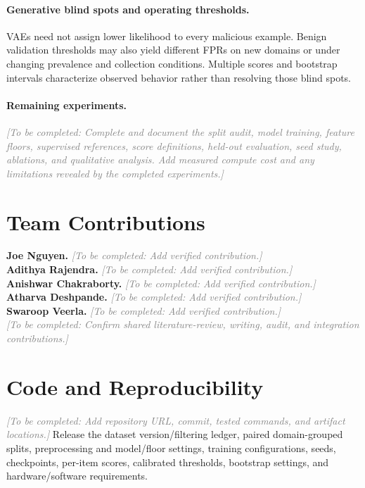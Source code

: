 \documentclass{article}
\newcommand{\pending}[1]{\textcolor{gray}{\textit{[To be completed: #1]}}}
\begin{document}
\paragraph{Generative blind spots and operating thresholds.}
VAEs need not assign lower likelihood to every malicious example.
Benign validation thresholds may also yield different FPRs on new domains or under changing prevalence and collection conditions.
Multiple scores and bootstrap intervals characterize observed behavior rather than resolving those blind spots.

\paragraph{Remaining experiments.}
\pending{Complete and document the split audit, model training, feature floors, supervised references, score definitions, held-out evaluation, seed study, ablations, and qualitative analysis. Add measured compute cost and any limitations revealed by the completed experiments.}

\section*{Team Contributions}

\noindent\textbf{Joe Nguyen.} \pending{Add verified contribution.}\\
\noindent\textbf{Adithya Rajendra.} \pending{Add verified contribution.}\\
\noindent\textbf{Anishwar Chakraborty.} \pending{Add verified contribution.}\\
\noindent\textbf{Atharva Deshpande.} \pending{Add verified contribution.}\\
\noindent\textbf{Swaroop Veerla.} \pending{Add verified contribution.}\\
\pending{Confirm shared literature-review, writing, audit, and integration contributions.}

\section*{Code and Reproducibility}
\pending{Add repository URL, commit, tested commands, and artifact locations.}
Release the dataset version/filtering ledger, paired domain-grouped splits, preprocessing and model/floor settings, training configurations, seeds, checkpoints, per-item scores, calibrated thresholds, bootstrap settings, and hardware/software requirements.



\end{document}
